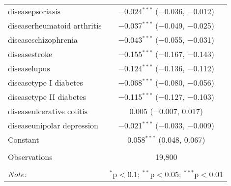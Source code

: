 \begin{table}[!htbp]
\begin{tabular}{@{\extracolsep{5pt}}lc}
  diseasepsoriasis & $-$0.024$^{***}$ ($-$0.036, $-$0.012) \\ 
  diseaserheumatoid arthritis & $-$0.037$^{***}$ ($-$0.049, $-$0.025) \\ 
  diseaseschizophrenia & $-$0.043$^{***}$ ($-$0.055, $-$0.031) \\ 
  diseasestroke & $-$0.155$^{***}$ ($-$0.167, $-$0.143) \\ 
  diseaselupus & $-$0.124$^{***}$ ($-$0.136, $-$0.112) \\ 
  diseasetype I diabetes & $-$0.068$^{***}$ ($-$0.080, $-$0.056) \\ 
  diseasetype II diabetes & $-$0.115$^{***}$ ($-$0.127, $-$0.103) \\ 
  diseaseulcerative colitis & 0.005 ($-$0.007, 0.017) \\ 
  diseaseunipolar depression & $-$0.021$^{***}$ ($-$0.033, $-$0.009) \\ 
  Constant & 0.058$^{***}$ (0.048, 0.067) \\ 
 \hline \\[-1.8ex] 
Observations & 19,800 \\ 
\hline 
\hline \\[-1.8ex] 
\textit{Note:}  & \multicolumn{1}{r}{$^{*}$p$<$0.1; $^{**}$p$<$0.05; $^{***}$p$<$0.01} \\ 
\end{tabular} 
\end{table} 
